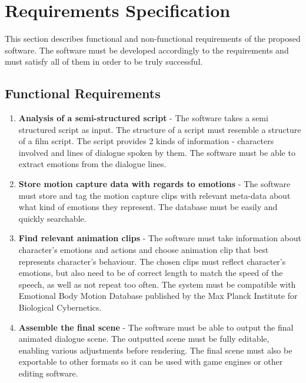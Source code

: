 \chapter{Requirements Specification\label{chap:requirements}}

\noindent This section describes functional and non-functional requirements of the proposed software. The software must be developed accordingly to the requirements  and must satisfy all of them in order to be truly successful.


\section{Functional Requirements}

\begin{enumerate}

\item {\bf Analysis of a semi-structured script} - The software takes a semi structured script as input. The structure of a script must resemble a structure of a film script. The script provides 2 kinds of information - characters involved and lines of dialogue spoken by them. The software must be able to extract emotions from the dialogue lines.

\item {\bf Store motion capture data with regards to emotions} - The software must store and tag the motion capture clips with relevant meta-data about what kind of emotions they represent. The database must be easily and quickly searchable.

\item {\bf Find relevant animation clips} - The software must take information about character's emotions and actions and choose animation clip that best represents character's behaviour. The chosen clips must reflect character's emotions, but also need to be of correct length to match the speed of the speech, as well as not repeat too often. The system must be compatible with Emotional Body Motion Database published by the Max Planck Institute for Biological Cybernetics.

\item {\bf Assemble the final scene} -  The software must be able to output the final animated dialogue scene. The outputted scene must be fully editable, enabling various adjustments before rendering. The final scene must also be exportable to other formats so it can be used with game engines or other editing software.

\end{enumerate}


